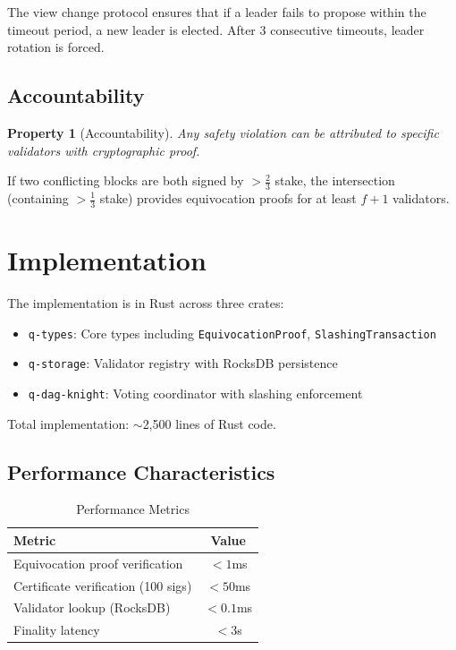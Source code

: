 \documentclass[11pt,a4paper]{article}
\newtheorem{property}{Property}
\begin{document}
The view change protocol ensures that if a leader fails to propose within the timeout period, a new leader is elected. After $3$ consecutive timeouts, leader rotation is forced.

\subsection{Accountability}

\begin{property}[Accountability]
Any safety violation can be attributed to specific validators with cryptographic proof.
\end{property}

If two conflicting blocks are both signed by $> \frac{2}{3}$ stake, the intersection (containing $> \frac{1}{3}$ stake) provides equivocation proofs for at least $f + 1$ validators.

\section{Implementation}

The implementation is in Rust across three crates:

\begin{itemize}
    \item \texttt{q-types}: Core types including \texttt{EquivocationProof}, \texttt{SlashingTransaction}
    \item \texttt{q-storage}: Validator registry with RocksDB persistence
    \item \texttt{q-dag-knight}: Voting coordinator with slashing enforcement
\end{itemize}

Total implementation: $\sim$2,500 lines of Rust code.

\subsection{Performance Characteristics}

\begin{table}[h]
\centering
\begin{tabular}{|l|c|}
\hline
\textbf{Metric} & \textbf{Value} \\
\hline
Equivocation proof verification & $< 1$ms \\
Certificate verification (100 sigs) & $< 50$ms \\
Validator lookup (RocksDB) & $< 0.1$ms \\
Finality latency & $< 3$s \\
\hline
\end{tabular}
\caption{Performance Metrics}
\end{table}
\end{document}
